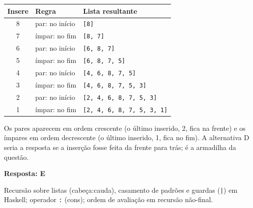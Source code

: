 \documentclass[11pt,a4paper]{article}
\newcommand{\resposta}[1]{\begin{gabarito}\textbf{Resposta: #1}\end{gabarito}}
\begin{document}
\begin{center}
\begin{tabular}{@{}cll@{}}
\toprule
Insere & Regra & Lista resultante\\
\midrule
8 & par: no início & \texttt{[8]}\\
7 & ímpar: no fim  & \texttt{[8, 7]}\\
6 & par: no início & \texttt{[6, 8, 7]}\\
5 & ímpar: no fim  & \texttt{[6, 8, 7, 5]}\\
4 & par: no início & \texttt{[4, 6, 8, 7, 5]}\\
3 & ímpar: no fim  & \texttt{[4, 6, 8, 7, 5, 3]}\\
2 & par: no início & \texttt{[2, 4, 6, 8, 7, 5, 3]}\\
1 & ímpar: no fim  & \texttt{[2, 4, 6, 8, 7, 5, 3, 1]}\\
\bottomrule
\end{tabular}
\end{center}
Os pares aparecem em ordem crescente (o último inserido, 2, fica na frente) e os ímpares em ordem
decrescente (o último inserido, 1, fica no fim). A alternativa D seria a resposta se a inserção fosse
feita da frente para trás; é a armadilha da questão.

\resposta{E}

\begin{dica}
Recursão sobre listas (cabeça:cauda), casamento de padrões e guardas (\texttt{|}) em Haskell;
operador \texttt{:} (cons); ordem de avaliação em recursão não-final.
\end{dica}

\end{document}
